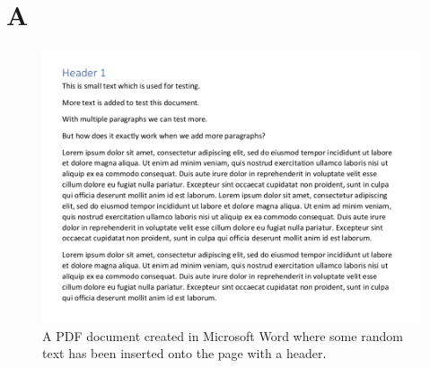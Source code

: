 \appendix
\chapter{A}
\begin{figure}[h]
    \hspace{-18mm}
    \includegraphics[scale=0.6]{latex/media/exm.png}
    \caption{A PDF document created in Microsoft Word where some random text has been inserted onto the page with a header.}
    \label{fig:example-pdf-lorem-ipsum}
\end{figure}
